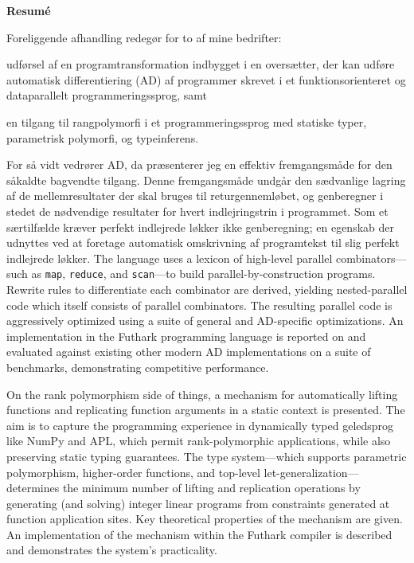 \newpage
\begin{center}
\textbf{Resum\'e}
\end{center}
Foreliggende afhandling redegør for to af mine bedrifter:
\begin{enumerate*}[label=\arabic*)]
\item udførsel af en programtransformation indbygget i en oversætter,
  der kan udføre automatisk differentiering (AD) af programmer skrevet
  i et funktionsorienteret og dataparallelt programmeringssprog, samt
\item en tilgang til rangpolymorfi i et programmeringssprog med
  statiske typer, parametrisk polymorfi, og typeinferens.
\end{enumerate*}

For så vidt vedrører AD, da præsenterer jeg en effektiv fremgangsmåde
for den såkaldte bagvendte tilgang. Denne fremgangsmåde undgår den
sædvanlige lagring af de mellemresultater der skal bruges til
returgennemløbet, og genberegner i stedet de nødvendige resultater for
hvert indlejringstrin i programmet. Som et særtilfælde kræver perfekt
indlejrede løkker ikke genberegning; en egenskab der udnyttes ved at
foretage automatisk omskrivning af programtekst til slig perfekt
indlejrede løkker.
%
The language uses a lexicon of high-level parallel combinators---such as
\texttt{map}, \texttt{reduce}, and \texttt{scan}---to build
parallel-by-construction programs. Rewrite rules to differentiate each
combinator are derived, yielding nested-parallel code which itself consists of
parallel combinators. The resulting parallel code is aggressively optimized
using a suite of general and AD-specific optimizations.
%
An implementation in the Futhark programming language is reported on and
evaluated against existing other modern AD implementations on a suite of
benchmarks, demonstrating competitive performance.

On the rank polymorphism side of things, a mechanism for automatically lifting
functions and replicating function arguments in a static context is
presented. The aim is to capture the programming experience in dynamically typed
geledsprog like NumPy and APL, which permit rank-polymorphic applications,
while also preserving static typing guarantees. The type system---which supports
parametric polymorphism, higher-order functions, and top-level
let-generalization---determines the minimum number of lifting and replication
operations by generating (and solving) integer linear programs from constraints
generated at function application sites. Key theoretical properties of the
mechanism are given. An implementation of the mechanism within the Futhark
compiler is described and demonstrates the system's practicality.
